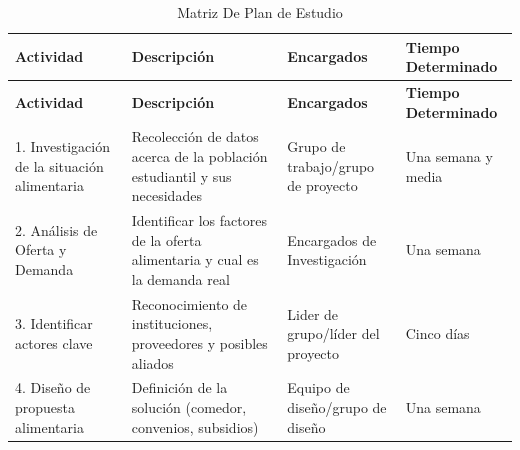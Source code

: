 \documentclass[letterpaper, 11pt]{report}
\begin{document}
\begin{longtable}{|p{.2\linewidth}|p{.2\linewidth}|p{.3\linewidth}|p{.2\linewidth}|}
      \caption{Matriz De Plan de Estudio}                                                                                                                                                                                  \\
      \hline
      \textbf{Actividad}                           & \textbf{Descripción}                                                        & \textbf{Encargados}                      & \textbf{Tiempo \hfil{} \break{}Determinado}  \\
      \hline
      \endfirsthead

      \hline
      \textbf{Actividad}                           & \textbf{Descripción}                                                        & \textbf{Encargados}                      & \textbf{Tiempo \hfil{} \break{} Determinado} \\
      \hline
      \endhead

      \hline
      \endfoot

      \hline
      \endlastfoot

      1. Investigación de la situación alimentaria & Recolección de datos acerca de la
      población estudiantil y sus necesidades      & Grupo de trabajo/grupo de proyecto                                          &
      Una semana y media                                                                                                                                                                                                   \\\hline

      2. Análisis de Oferta y Demanda              & Identificar los factores de la oferta alimentaria y cual es la demanda real & Encargados de Investigación              & Una semana                                   \\\hline

      3. Identificar actores clave                 & Reconocimiento de instituciones, proveedores y posibles aliados             & Lider de grupo/líder del proyecto        & Cinco días                                   \\\hline

      4. Diseño de propuesta alimentaria           & Definición de la solución (comedor, convenios, subsidios)                   & Equipo de diseño/grupo de diseño         & Una semana                                   \\\hline


\end{longtable}
\end{document}
